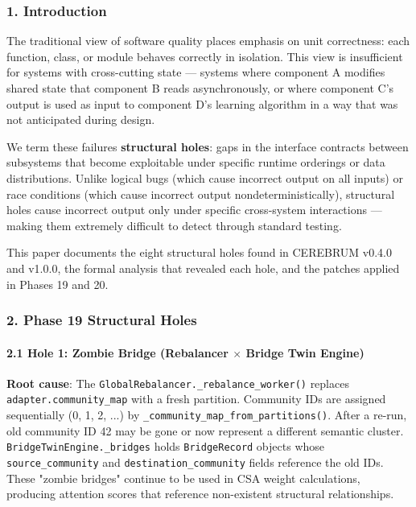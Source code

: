 \documentclass[10pt,journal,compsoc]{IEEEtran}
\begin{document}
\subsubsection{1. Introd\-uction}
The traditional view of software quality places emphasis on unit correctness: each function, class, or module behaves correctly in isolation. This view is insuf\-ficient for systems with cross-cutting state — systems where component A modifies shared state that component B reads async\-hronously, or where component C's output is used as input to component D's learning algorithm in a way that was not anticipated during design.

We term these failures \textbf{structural holes}: gaps in the interface contracts between subsystems that become exploitable under specific runtime orderings or data distr\-ibutions. Unlike logical bugs (which cause incorrect output on all inputs) or race conditions (which cause incorrect output nonde\-terministi\-cally), structural holes cause incorrect output only under specific cross-system inter\-actions — making them extremely difficult to detect through standard testing.

This paper documents the eight structural holes found in CEREBRUM v0.4.0 and v1.0.0, the formal analysis that revealed each hole, and the patches applied in Phases 19 and 20.

\subsubsection{2. Phase 19 Structural Holes}

\paragraph{2.1 Hole 1: Zombie Bridge (Rebalancer $\times$ Bridge Twin Engine)}

\textbf{Root cause}: The \texttt{GlobalRebalancer.\_rebalance\_worker()} replaces \texttt{adapter.community\_map} with a fresh partition. Community IDs are assigned seque\-ntially (0, 1, 2, ...) by \texttt{\_community\_map\_from\_partitions()}. After a re-run, old community ID 42 may be gone or now represent a different semantic cluster. \texttt{BridgeTwinEngine.\_bridges} holds \texttt{BridgeRecord} objects whose \texttt{source\_community} and \texttt{destination\_community} fields reference the old IDs. These "zombie bridges" continue to be used in CSA weight calcu\-lations, producing attention scores that reference non-existent structural relat\-ionships.
\end{document}
